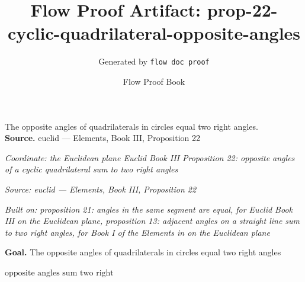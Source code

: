 \documentclass[11pt]{article}
\title{Flow Proof Artifact: prop-22-cyclic-quadrilateral-opposite-angles}
\author{Generated by \texttt{flow doc proof}}
\date{Flow Proof Book}
\theoremstyle{definition}
\begin{document}
\maketitle
The opposite angles of quadrilaterals in circles equal two right angles.\\[0.5em]
\textbf{Source.} euclid — Elements, Book III, Proposition 22\\[0.5em]
\bigskip
{}\par
\smallskip\noindent\textit{Coordinate: the Euclidean plane \cdot Euclid Book III \cdot Proposition 22: opposite angles of a cyclic quadrilateral sum to two right angles}\par
\smallskip\noindent\textit{Source: euclid — Elements, Book III, Proposition 22}\par
\smallskip\noindent\textit{Built on: proposition 21: angles in the same segment are equal, for Euclid Book III on the Euclidean plane, proposition 13: adjacent angles on a straight line sum to two right angles, for Book I of the Elements in on the Euclidean plane}\par
\medskip
\noindent\textbf{Goal.} The opposite angles of quadrilaterals in circles equal two right angles\par
\noindent$\displaystyle \text{opposite angles sum two right}$\par
\medskip
\noindent
\end{document}
